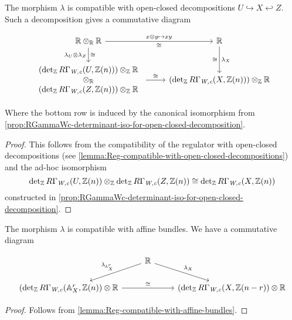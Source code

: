 \begin{lemma}
  \label{lemma:lambda-compatible-with-open-closed-decompositions}
  The morphism $\lambda$ is compatible with open-closed decompositions
  $U \hookrightarrow X \hookleftarrow Z$. Such a decomposition gives a
  commutative diagram

  \[ \begin{tikzcd}
      \RR \otimes_\RR\ar{d}{\isom}[swap]{\lambda_U\otimes\lambda_Z} \RR \ar{r}{x\otimes y\mapsto xy}[swap]{\isom} & \RR\ar{d}{\lambda_X}[swap]{\isom} \\
      \begin{array}{c} (\det\nolimits_\ZZ R\Gamma_\text{\it W,c} (U, \ZZ (n)))\otimes_\ZZ \RR \\ \otimes_\RR \\ (\det\nolimits_\ZZ R\Gamma_\text{\it W,c} (Z, \ZZ (n)))\otimes_\ZZ \RR \end{array}\ar{r}{\isom} & (\det\nolimits_\ZZ R\Gamma_\text{\it W,c} (X, \ZZ (n)))\otimes_\ZZ \RR
    \end{tikzcd} \]

  Where the bottom row is induced by the canonical isomorphism from
  \ref{prop:RGammaWc-determinant-iso-for-open-closed-decomposition}.

  \begin{proof}
    This follows from the compatibility of the regulator with open-closed
    decompositions
    (see \ref{lemma:Reg-compatible-with-open-closed-decompositions}) and the
    ad-hoc isomorphism
    \[ \det\nolimits_{\mathbb{Z}} R\Gamma_\text{\it W,c} (U, \mathbb{Z} (n))
      \otimes_{\mathbb{Z}}
      \det\nolimits_{\mathbb{Z}} R\Gamma_\text{\it W,c} (Z, \mathbb{Z} (n)) \cong
      \det\nolimits_{\mathbb{Z}} R\Gamma_\text{\it W,c} (X, \mathbb{Z} (n)) \]
    constructed in
    \ref{prop:RGammaWc-determinant-iso-for-open-closed-decomposition}.
  \end{proof}
\end{lemma}

\begin{lemma}
  \label{lemma:lambda-compatible-with-affina-bundles}
  The morphism $\lambda$ is compatible with affine bundles. We have a
  commutative diagram

  \[ \begin{tikzcd}
      & \RR\ar{dl}[swap]{\lambda_{\AA^r_X}}\ar{dr}{\lambda_X} \\
      (\det_\ZZ R\Gamma_\text{\it W,c} (\AA^r_X, \ZZ (n))\otimes\RR\ar{rr}{\isom} & & (\det_\ZZ R\Gamma_\text{\it W,c} (X, \ZZ (n-r))\otimes\RR
    \end{tikzcd} \]

  \begin{proof}
    Follows from \ref{lemma:Reg-compatible-with-affine-bundles}.
  \end{proof}
\end{lemma}

